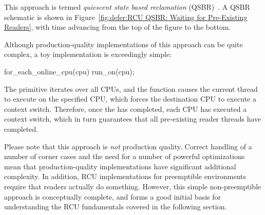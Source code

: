 This approach is termed \emph{quiescent state based reclamation}
(QSBR)~\cite{ThomasEHart2006a}.
A QSBR schematic is shown in
Figure~\ref{fig:defer:RCU QSBR: Waiting for Pre-Existing Readers},
with time advancing from the top of the figure to the bottom.

Although production-quality implementations of this approach can be
quite complex, a toy implementation is exceedingly simple:

\begin{VerbatimN}[samepage=true]
for_each_online_cpu(cpu)
	run_on(cpu);
\end{VerbatimN}

The  primitive iterates over all CPUs, and
the  function causes the current thread to execute on the
specified CPU, which forces the destination CPU to execute a context
switch.
Therefore, once the  has completed, each CPU
has executed a context switch, which in turn guarantees that
all pre-existing reader threads have completed.

Please note that this approach is \emph{not} production quality.
Correct handling of a number of corner cases and the need for a number
of powerful optimizations mean that production-quality implementations
have significant additional complexity.
In addition, RCU implementations for preemptible environments
require that readers actually do something.
However, this simple non-preemptible approach is conceptually complete,
and forms a good initial basis for understanding the RCU fundamentals
covered in the following section.
